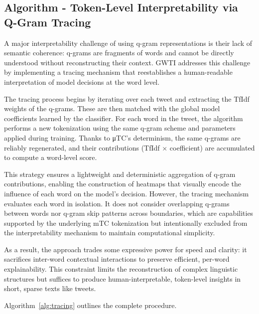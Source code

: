 \documentclass[runningheads,10pt]{llncs}
\begin{document}
\subsection{Algorithm - Token-Level Interpretability via Q-Gram Tracing}

A major interpretability challenge of using q-gram representations is their lack of semantic coherence: q-grams are fragments of words and cannot be directly understood without reconstructing their context. \ac{GWTI} addresses this challenge by implementing a tracing mechanism that reestablishes a human-readable interpretation of model decisions at the word level.

The tracing process begins by iterating over each tweet and extracting the \ac{TfIdf} weights of the q-grams. These are then matched with the global model coefficients learned by the classifier. For each word in the tweet, the algorithm performs a new tokenization using the same q-gram scheme and parameters applied during training. Thanks to μTC’s determinism, the same q-grams are reliably regenerated, and their contributions (\ac{TfIdf} × coefficient) are accumulated to compute a word-level score.

This strategy ensures a lightweight and deterministic aggregation of q-gram contributions, enabling the construction of heatmaps that visually encode the influence of each word on the model's decision. However, the tracing mechanism evaluates each word in isolation. It does not consider overlapping q-grams between words nor q-gram skip patterns across boundaries, which are capabilities supported by the underlying \ac{mTC} tokenization but intentionally excluded from the interpretability mechanism to maintain computational simplicity.

As a result, the approach trades some expressive power for speed and clarity: it sacrifices inter-word contextual interactions to preserve efficient, per-word explainability. This constraint limits the reconstruction of complex linguistic structures but suffices to produce human-interpretable, token-level insights in short, sparse texts like tweets.

Algorithm~\ref{alg:tracing} outlines the complete procedure.
\end{document}
